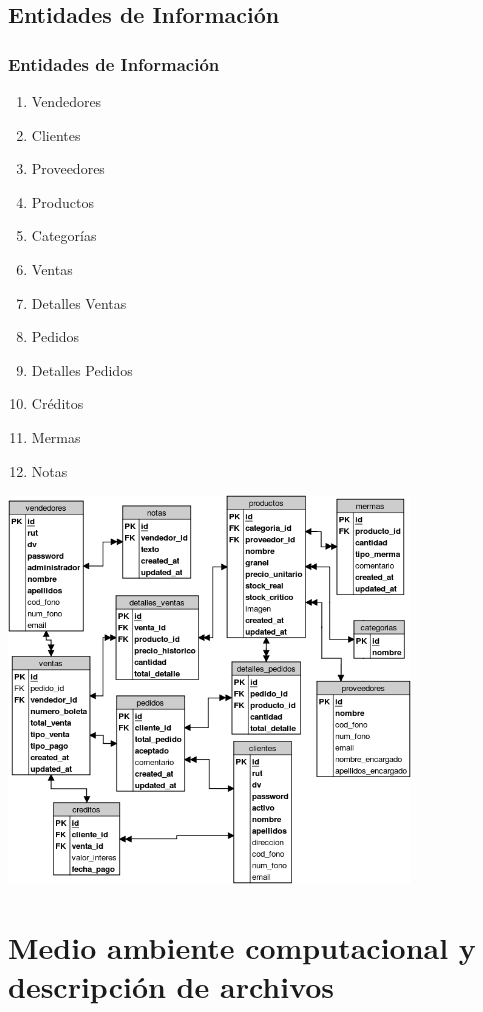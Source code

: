 \documentclass{beamer}
\begin{document}
\subsection{Entidades de Información}

\begin{frame}
\frametitle{Entidades de Información}
\begin{enumerate}
\item Vendedores
\item Clientes
\item Proveedores
\item Productos
\item Categorías
\item Ventas 
\item Detalles Ventas
\item Pedidos
\item Detalles Pedidos 
\item Créditos
\item Mermas  
\item Notas
\end{enumerate}
\end{frame}

\begin{frame}
\begin{center}
\includegraphics[width=0.8\textwidth]{images/modelo_relacional.png}
\end{center}
\end{frame}

\section{Medio ambiente computacional y descripción de archivos}
\end{document}
